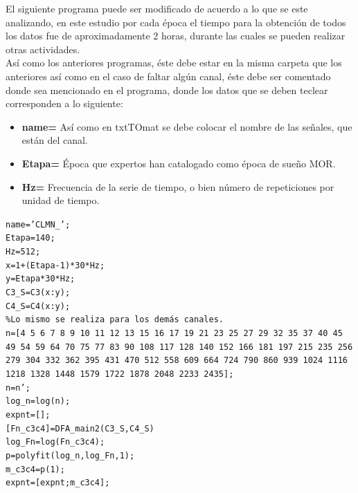 \documentclass[letterpaper,titlepage,12pt,draft]{report}
\begin{document}
El siguiente programa puede ser modificado de acuerdo a lo que se este analizando, en este estudio por cada \'epoca el tiempo para la obtenci\'on de todos los datos fue de aproximadamente 2 horas, durante las cuales se pueden realizar otras actividades.\\

As\'i como los anteriores programas, \'este debe estar en la misma carpeta que los anteriores as\'i como en el caso de faltar alg\'un canal, \'este debe ser comentado donde sea mencionado en el programa, donde los datos que se deben teclear corresponden a lo siguiente:
\begin{itemize}
\item {\bf name=} As\'i como en txtTOmat se debe colocar el nombre de las se\~nales, que est\'an del canal.
\item {\bf Etapa=} \'Epoca que expertos han catalogado como \'epoca de sue\~no MOR.
\item {\bf Hz=} Frecuencia de la serie de tiempo, o bien n\'umero de repeticiones por unidad de tiempo.
\end{itemize}

{\tt \setlength{\parindent}{0pt}name=\textcolor[cmyk]{0,1,0,0}{'CLMN\_'};\\
Etapa=140;\\
Hz=512;\\
x=1+(Etapa-1)*30*Hz;\\
y=Etapa*30*Hz;\\
C3\_S=C3(x:y);\\
C4\_S=C4(x:y);\\
\textcolor[cmyk]{1,0,1,0}{\%Lo mismo se realiza para los dem\'as canales.}\\
n=[4 5 6 7 8 9 10 11 12 13 15 16 17 19 21 23 25 27 29 32 35 37 40 45 49 54 59 64 70 75 77 83 90 108 117 128 140 152 166 181 197 215 235 256 279 304 332 362 395 431 470 512 558 609 664 724 790 860 939 1024 1116 1218 1328 1448 1579 1722 1878 2048 2233 2435];\\
n=n';\\
log\_n=log(n);\\
expnt=[];\\

}
{\tt \setlength{\parindent}{0pt}[Fn\_c3c4]=DFA\_main2(C3\_S,C4\_S)\\
log\_Fn=log(Fn\_c3c4);\\
p=polyfit(log\_n,log\_Fn,1);\\
m\_c3c4=p(1);\\
expnt=[expnt;m\_c3c4];\\}
\end{document}
